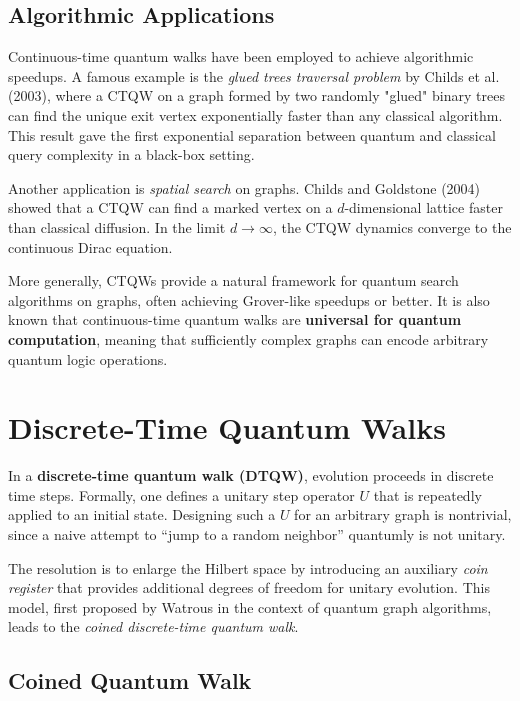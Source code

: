 \documentclass[12pt]{report}
\begin{document}
\subsection{Algorithmic Applications}

Continuous-time quantum walks have been employed to achieve algorithmic speedups. A famous example is the \emph{glued trees traversal problem} by Childs et al. (2003), where a CTQW on a graph formed by two randomly "glued" binary trees can find the unique exit vertex exponentially faster than any classical algorithm. This result gave the first exponential separation between quantum and classical query complexity in a black-box setting.

Another application is \emph{spatial search} on graphs. Childs and Goldstone (2004) showed that a CTQW can find a marked vertex on a $d$-dimensional lattice faster than classical diffusion. In the limit $d \to \infty$, the CTQW dynamics converge to the continuous Dirac equation.

More generally, CTQWs provide a natural framework for quantum search algorithms on graphs, often achieving Grover-like speedups or better. It is also known that continuous-time quantum walks are \textbf{universal for quantum computation}, meaning that sufficiently complex graphs can encode arbitrary quantum logic operations.



\section{Discrete-Time Quantum Walks}



In a \textbf{discrete-time quantum walk (DTQW)}, evolution proceeds in discrete time steps. Formally, one defines a unitary step operator $U$ that is repeatedly applied to an initial state. Designing such a $U$ for an arbitrary graph is nontrivial, since a naive attempt to “jump to a random neighbor” quantumly is not unitary.

The resolution is to enlarge the Hilbert space by introducing an auxiliary \emph{coin register} that provides additional degrees of freedom for unitary evolution. This model, first proposed by Watrous in the context of quantum graph algorithms, leads to the \emph{coined discrete-time quantum walk}.

\subsection{Coined Quantum Walk}
\end{document}
